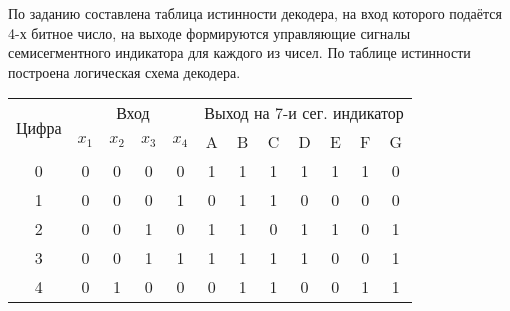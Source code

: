 






По заданию составлена таблица истинности декодера, на вход которого подаётся 4-х битное число, на выходе формируются управляющие сигналы семисегментного индикатора для каждого из чисел. По таблице истинности построена логическая схема декодера.

\begin{table}[!h]
	\begin{tabular}{|c|cccc|ccccccc|}
		\hline
		\multirow{2}{*}{Цифра} & \multicolumn{4}{c|}{Вход}                                                        & \multicolumn{7}{c|}{Выход на 7-и сег. индикатор}                                                                                                  \\ \cline{2-12} 
		& \multicolumn{1}{c|}{$x_1$} & \multicolumn{1}{c|}{$x_2$} & \multicolumn{1}{c|}{$x_3$} & $x_4$ & \multicolumn{1}{c|}{A} & \multicolumn{1}{c|}{B} & \multicolumn{1}{c|}{C} & \multicolumn{1}{c|}{D} & \multicolumn{1}{c|}{E} & \multicolumn{1}{c|}{F} & \multicolumn{1}{c|}{G} \\ \hline
		0                      & \multicolumn{1}{c|}{0}  & \multicolumn{1}{c|}{0}  & \multicolumn{1}{c|}{0}  & 0  & \multicolumn{1}{c|}{1} & \multicolumn{1}{c|}{1} & \multicolumn{1}{c|}{1} & \multicolumn{1}{c|}{1} & \multicolumn{1}{c|}{1} & \multicolumn{1}{c|}{1} & 0 \\ \hline
		1                      & \multicolumn{1}{c|}{0}  & \multicolumn{1}{c|}{0}  & \multicolumn{1}{c|}{0}  & 1  & \multicolumn{1}{c|}{0} & \multicolumn{1}{c|}{1} & \multicolumn{1}{c|}{1} & \multicolumn{1}{c|}{0} & \multicolumn{1}{c|}{0} & \multicolumn{1}{c|}{0} & 0 \\ \hline
		2                      & \multicolumn{1}{c|}{0}  & \multicolumn{1}{c|}{0}  & \multicolumn{1}{c|}{1}  & 0  & \multicolumn{1}{c|}{1} & \multicolumn{1}{c|}{1} & \multicolumn{1}{c|}{0} & \multicolumn{1}{c|}{1} & \multicolumn{1}{c|}{1} & \multicolumn{1}{c|}{0} & 1 \\ \hline
		3                      & \multicolumn{1}{c|}{0}  & \multicolumn{1}{c|}{0}  & \multicolumn{1}{c|}{1}  & 1  & \multicolumn{1}{c|}{1} & \multicolumn{1}{c|}{1} & \multicolumn{1}{c|}{1} & \multicolumn{1}{c|}{1} & \multicolumn{1}{c|}{0} & \multicolumn{1}{c|}{0} & 1 \\ \hline
		4                      & \multicolumn{1}{c|}{0}  & \multicolumn{1}{c|}{1}  & \multicolumn{1}{c|}{0}  & 0  & \multicolumn{1}{c|}{0} & \multicolumn{1}{c|}{1} & \multicolumn{1}{c|}{1} & \multicolumn{1}{c|}{0} & \multicolumn{1}{c|}{0} & \multicolumn{1}{c|}{1} & 1 \\ \hline

\end{tabular}
\end{table}
